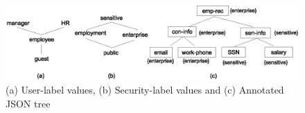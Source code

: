   	\begin{figure} [t]
 		\centering
 		\includegraphics[width=1\textwidth]{NSS16/operational-explanation}
 		\caption{(a) User-label values, (b) Security-label values and (c)  Annotated JSON tree}
 		\label{fig:operational-explanation}
 	\end{figure}
 